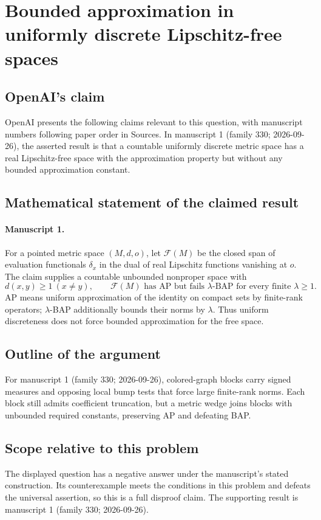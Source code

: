 \documentclass[11pt]{article}
\begin{document}
\section*{Bounded approximation in uniformly discrete Lipschitz-free spaces}

\subsection{OpenAI's claim}
OpenAI presents the following claims relevant to this question, with manuscript numbers following paper order in Sources. In manuscript 1 (family 330; 2026-09-26), the asserted result is that a countable uniformly discrete metric space has a real Lipschitz-free space with the approximation property but without any bounded approximation constant.

\subsection{Mathematical statement of the claimed result}
\paragraph{Manuscript 1.}
For a pointed metric space $(M,d,o)$, let $\mathcal F(M)$ be the closed span of evaluation functionals $\delta_x$ in the dual of real Lipschitz functions vanishing at $o$. The claim supplies a countable unbounded nonproper space with
\[
 d(x,y)\ge1\ (x\ne y),\qquad
 \mathcal F(M)\text{ has AP but fails }\lambda\text{-BAP for every finite }\lambda\ge1.
\]
AP means uniform approximation of the identity on compact sets by finite-rank operators; $\lambda$-BAP additionally bounds their norms by $\lambda$. Thus uniform discreteness does not force bounded approximation for the free space.

\subsection{Outline of the argument}
For manuscript 1 (family 330; 2026-09-26), colored-graph blocks carry signed measures and opposing local bump tests that force large finite-rank norms. Each block still admits coefficient truncation, but a metric wedge joins blocks with unbounded required constants, preserving AP and defeating BAP.

\subsection{Scope relative to this problem}
The displayed question has a negative answer under the manuscript's stated construction. Its counterexample meets the conditions in this problem and defeats the universal assertion, so this is a full disproof claim. The supporting result is manuscript 1 (family 330; 2026-09-26).
\end{document}
